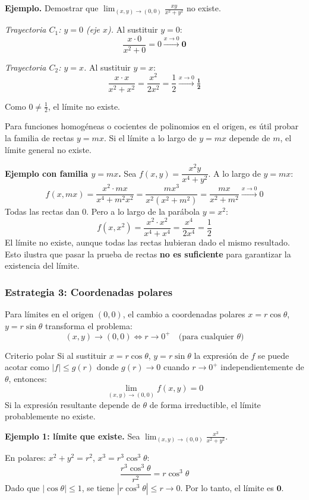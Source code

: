 \textbf{Ejemplo.} Demostrar que $\displaystyle\lim_{(x,y)\to(0,0)} \frac{xy}{x^2+y^2}$ no existe.

\textit{Trayectoria $C_1$: $y = 0$ (eje $x$).} Al sustituir $y=0$:
\[ \frac{x \cdot 0}{x^2 + 0} = 0 \xrightarrow{x\to 0} \mathbf{0} \]

\textit{Trayectoria $C_2$: $y = x$.} Al sustituir $y=x$:
\[ \frac{x \cdot x}{x^2 + x^2} = \frac{x^2}{2x^2} = \frac{1}{2} \xrightarrow{x\to 0} \mathbf{\tfrac{1}{2}} \]

Como $0 \neq \tfrac{1}{2}$, el límite no existe.

Para funciones homogéneas o cocientes de polinomios en el origen, es útil probar la familia de rectas $y = mx$. Si el límite a lo largo de $y = mx$ depende de $m$, el límite general no existe.

\textbf{Ejemplo con familia $y = mx$.} Sea $f(x,y) = \dfrac{x^2 y}{x^4 + y^2}$. A lo largo de $y = mx$:
\[ f(x, mx) = \frac{x^2 \cdot mx}{x^4 + m^2x^2} = \frac{mx^3}{x^2(x^2 + m^2)} = \frac{mx}{x^2 + m^2} \xrightarrow{x\to 0} 0 \]
Todas las rectas dan $0$. Pero a lo largo de la parábola $y = x^2$:
\[ f(x, x^2) = \frac{x^2 \cdot x^2}{x^4 + x^4} = \frac{x^4}{2x^4} = \frac{1}{2} \]
El límite no existe, aunque todas las rectas hubieran dado el mismo resultado. Esto ilustra que pasar la prueba de rectas \textbf{no es suficiente} para garantizar la existencia del límite.

\subsubsection{Estrategia 3: Coordenadas polares}

Para límites en el origen $(0,0)$, el cambio a coordenadas polares $x = r\cos\theta$, $y = r\sin\theta$ transforma el problema:
\[ (x,y) \to (0,0) \iff r \to 0^+ \quad \text{(para cualquier } \theta) \]

\begin{mynote}{Criterio polar}
Si al sustituir $x = r\cos\theta$, $y = r\sin\theta$ la expresión de $f$ se puede acotar como $|f| \leq g(r)$ donde $g(r) \to 0$ cuando $r \to 0^+$ independientemente de $\theta$, entonces:
\[ \lim_{(x,y)\to(0,0)} f(x,y) = 0 \]
Si la expresión resultante depende de $\theta$ de forma irreductible, el límite probablemente no existe.
\end{mynote}

\textbf{Ejemplo 1: límite que existe.} Sea $\displaystyle\lim_{(x,y)\to(0,0)}\frac{x^3}{x^2+y^2}$.

En polares: $x^2 + y^2 = r^2$, $x^3 = r^3\cos^3\theta$:
\[ \frac{r^3\cos^3\theta}{r^2} = r\cos^3\theta \]
Dado que $|\cos\theta| \leq 1$, se tiene $|r\cos^3\theta| \leq r \to 0$. Por lo tanto, el límite es $\mathbf{0}$.

